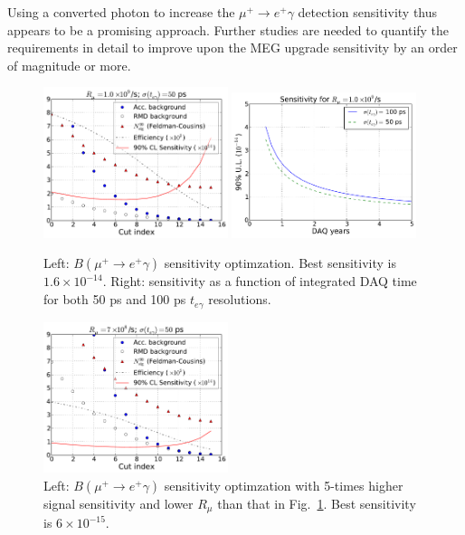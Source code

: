 Using a converted photon to increase the $\mu^+\to e^+\gamma$ detection
sensitivity thus appears to be a promising approach. Further studies are 
needed to quantify the requirements in detail to improve upon the MEG upgrade
sensitivity by an order of magnitude or more.

\begin{figure}[htbp]
   \centering
   \includegraphics[width=0.48\textwidth]{ChargedLeptons/Figures/muegamma-sens-1e9-1p5y-50ps.pdf} 
   \includegraphics[width=0.48\textwidth]{ChargedLeptons/Figures/muegamma-sens-years-1e9-2.pdf} 
   \caption{Left: $B(\mu^+\to e^+\gamma)$ sensitivity optimzation. 
Best sensitivity is $1.6\times 10^{-14}$. Right: sensitivity as a function of integrated DAQ time for both 50 ps and 100 ps $t_{e\gamma}$ resolutions.}
   \label{fig:muegamma-sensitivity}
\end{figure}

\begin{figure}[htbp]
\centering
\includegraphics[width=0.48\textwidth]{ChargedLeptons/Figures/muegamma-sens-7e8-1p5y-50ps-x5sigeff.pdf}
\caption{Left: $B(\mu^+\to e^+\gamma)$ sensitivity optimzation with 5-times
higher signal sensitivity and lower $R_\mu$ than that in 
Fig.~\ref{fig:muegamma-sensitivity}. Best sensitivity is $6\times 10^{-15}$.}
\label{fig:muegamma-sens-5x}
\end{figure}

